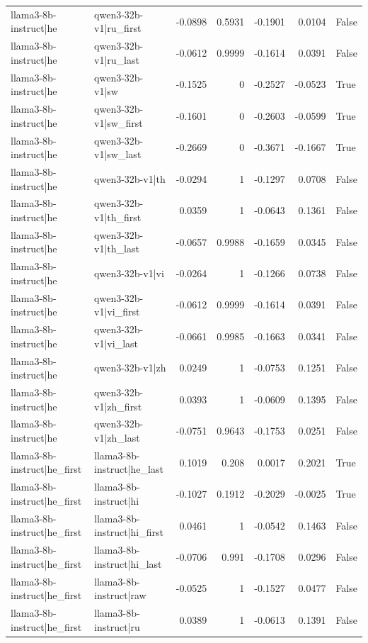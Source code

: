 \begin{table}
\begin{tabular}{l l r r r r l}
llama3-8b-instruct|he & qwen3-32b-v1|ru_first & -0.0898 & 0.5931 & -0.1901 & 0.0104 & False \\
llama3-8b-instruct|he & qwen3-32b-v1|ru_last & -0.0612 & 0.9999 & -0.1614 & 0.0391 & False \\
llama3-8b-instruct|he & qwen3-32b-v1|sw & -0.1525 & 0 & -0.2527 & -0.0523 & True \\
llama3-8b-instruct|he & qwen3-32b-v1|sw_first & -0.1601 & 0 & -0.2603 & -0.0599 & True \\
llama3-8b-instruct|he & qwen3-32b-v1|sw_last & -0.2669 & 0 & -0.3671 & -0.1667 & True \\
llama3-8b-instruct|he & qwen3-32b-v1|th & -0.0294 & 1 & -0.1297 & 0.0708 & False \\
llama3-8b-instruct|he & qwen3-32b-v1|th_first & 0.0359 & 1 & -0.0643 & 0.1361 & False \\
llama3-8b-instruct|he & qwen3-32b-v1|th_last & -0.0657 & 0.9988 & -0.1659 & 0.0345 & False \\
llama3-8b-instruct|he & qwen3-32b-v1|vi & -0.0264 & 1 & -0.1266 & 0.0738 & False \\
llama3-8b-instruct|he & qwen3-32b-v1|vi_first & -0.0612 & 0.9999 & -0.1614 & 0.0391 & False \\
llama3-8b-instruct|he & qwen3-32b-v1|vi_last & -0.0661 & 0.9985 & -0.1663 & 0.0341 & False \\
llama3-8b-instruct|he & qwen3-32b-v1|zh & 0.0249 & 1 & -0.0753 & 0.1251 & False \\
llama3-8b-instruct|he & qwen3-32b-v1|zh_first & 0.0393 & 1 & -0.0609 & 0.1395 & False \\
llama3-8b-instruct|he & qwen3-32b-v1|zh_last & -0.0751 & 0.9643 & -0.1753 & 0.0251 & False \\
llama3-8b-instruct|he_first & llama3-8b-instruct|he_last & 0.1019 & 0.208 & 0.0017 & 0.2021 & True \\
llama3-8b-instruct|he_first & llama3-8b-instruct|hi & -0.1027 & 0.1912 & -0.2029 & -0.0025 & True \\
llama3-8b-instruct|he_first & llama3-8b-instruct|hi_first & 0.0461 & 1 & -0.0542 & 0.1463 & False \\
llama3-8b-instruct|he_first & llama3-8b-instruct|hi_last & -0.0706 & 0.991 & -0.1708 & 0.0296 & False \\
llama3-8b-instruct|he_first & llama3-8b-instruct|raw & -0.0525 & 1 & -0.1527 & 0.0477 & False \\
llama3-8b-instruct|he_first & llama3-8b-instruct|ru & 0.0389 & 1 & -0.0613 & 0.1391 & False \\

\end{tabular}
\end{table}
